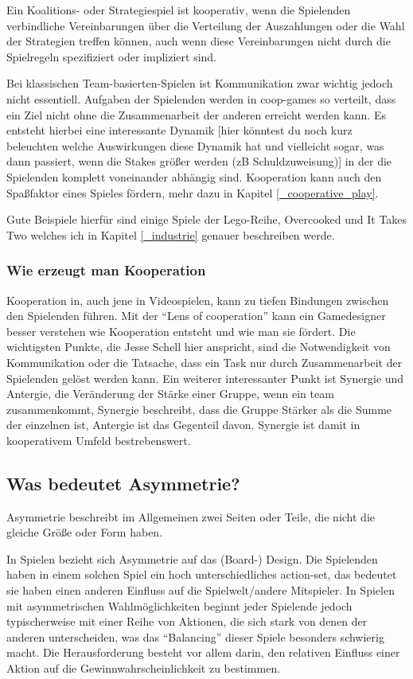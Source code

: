 Ein Koalitions- oder Strategiespiel ist kooperativ, wenn die Spielenden verbindliche Vereinbarungen über die Verteilung der Auszahlungen oder die Wahl der Strategien treffen können, auch wenn diese Vereinbarungen nicht durch die Spielregeln spezifiziert oder impliziert sind\cite{_introduction_to_the_theory_of_cooperative_games}.

Bei klassischen Team-basierten-Spielen ist Kommunikation zwar wichtig jedoch nicht essentiell. Aufgaben der Spielenden werden in coop-games so verteilt, dass ein Ziel nicht ohne die Zusammenarbeit der anderen erreicht werden kann. Es entsteht hierbei eine interessante Dynamik [hier könntest du noch kurz beleuchten welche Auswirkungen diese Dynamik hat und vielleicht sogar, was dann passiert, wenn die Stakes größer werden (zB Schuldzuweisung)] in der die Spielenden komplett voneinander abhängig sind. Kooperation kann auch den Spaßfaktor eines Spieles fördern, mehr dazu in Kapitel \ref{_cooperative_play}.

Gute Beispiele hierfür sind einige Spiele der Lego-Reihe, Overcooked und It Takes Two welches ich in Kapitel \ref{_industrie} genauer beschreiben werde.

\subsubsection{Wie erzeugt man Kooperation}
Kooperation in, auch jene in Videospielen, kann zu tiefen Bindungen zwischen den Spielenden führen.
Mit der "`Lens of cooperation"'\cite[S. 311]{_gamemechanics_for_cooperative_games} kann ein Gamedesigner besser verstehen wie Kooperation entsteht und wie man sie fördert. Die wichtigsten Punkte, die Jesse Schell hier anspricht, sind die Notwendigkeit von Kommunikation oder die Tatsache, dass ein Task nur durch Zusammenarbeit der Spielenden gelöst werden kann. Ein weiterer interessanter Punkt ist Synergie und Antergie, die Veränderung der Stärke einer Gruppe, wenn ein team zusammenkommt, Synergie beschreibt, dass die Gruppe Stärker als die Summe der einzelnen ist, Antergie ist das Gegenteil davon. Synergie ist damit in kooperativem Umfeld bestrebenswert.

\subsection{Was bedeutet Asymmetrie?}

Asymmetrie beschreibt im Allgemeinen zwei Seiten oder Teile, die nicht die gleiche Größe oder Form haben\cite{_oxford_dict}.

In Spielen bezieht sich Asymmetrie auf das (Board-) Design. Die Spielenden haben in einem solchen Spiel ein hoch unterschiedliches action-set, das bedeutet sie haben einen anderen Einfluss auf die Spielwelt/andere Mitspieler. In Spielen mit asymmetrischen Wahlmöglichkeiten beginnt jeder Spielende jedoch typischerweise mit einer Reihe von Aktionen, die sich stark von denen der anderen unterscheiden, was das "`Balancing"' dieser Spiele besonders schwierig macht. Die Herausforderung besteht vor allem darin, den relativen Einfluss einer Aktion auf die Gewinnwahrscheinlichkeit zu bestimmen\cite[S. 18]{_balancing_asymmetric_video_games}.
